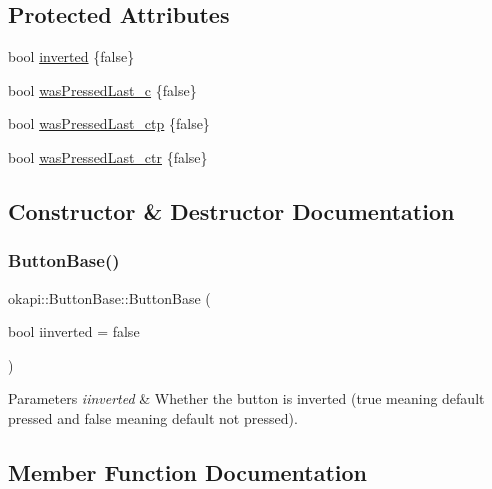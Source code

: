 \subsection*{Protected Attributes}
\begin{DoxyCompactItemize}
\item 
bool \mbox{\hyperlink{classokapi_1_1ButtonBase_a6eca82b96f124416c295520de271e91d}{inverted}} \{false\}
\item 
bool \mbox{\hyperlink{classokapi_1_1ButtonBase_a21864143d48104dfe9b7dd7b6b52fe7f}{was\+Pressed\+Last\+\_\+c}} \{false\}
\item 
bool \mbox{\hyperlink{classokapi_1_1ButtonBase_a12c3c9abdb6937795849d0a3442bc7d0}{was\+Pressed\+Last\+\_\+ctp}} \{false\}
\item 
bool \mbox{\hyperlink{classokapi_1_1ButtonBase_ac6cc2a03f469e31fa0be8719716e4dfc}{was\+Pressed\+Last\+\_\+ctr}} \{false\}
\end{DoxyCompactItemize}


\subsection{Constructor \& Destructor Documentation}
\mbox{\label{classokapi_1_1ButtonBase_a6327e273244bac5ca425f23999807849}} 
\subsubsection{\texorpdfstring{ButtonBase()}{ButtonBase()}}
{\footnotesize\ttfamily okapi\+::\+Button\+Base\+::\+Button\+Base (\begin{DoxyParamCaption}\item[{bool}]{iinverted = {\ttfamily false} }\end{DoxyParamCaption})\hspace{0.3cm}{\ttfamily [explicit]}}


\begin{DoxyParams}{Parameters}
{\em iinverted} & Whether the button is inverted ({\ttfamily true} meaning default pressed and {\ttfamily false} meaning default not pressed). \\
\hline
\end{DoxyParams}


\subsection{Member Function Documentation}
\mbox{\label{classokapi_1_1ButtonBase_a0d70e238573b2454fec934a6a7b2338d}} 

